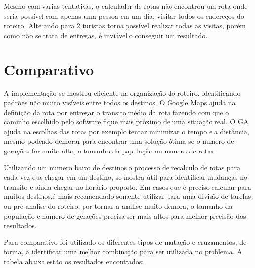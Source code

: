 Mesmo com varias tentativas, o calculador de rotas não encontrou um rota onde seria possível com apenas uma pessoa em um dia, visitar todos os endereços do roteiro. Alterando para 2 turistas torna possível realizar todas as visitas, porém como não se trata de entregas, é inviável o conseguir um resultado.

\pagebreak
\section{Comparativo}

A implementação se mostrou eficiente na organização do roteiro, identificando padrões não muito visíveis entre todos os destinos. O Google Maps ajuda na definição da rota por entregar o transito médio da rota fazendo com que o caminho escolhido pelo software fique mais próximo de uma situação real. O GA ajuda na escolhas das rotas por exemplo tentar minimizar o tempo e a distância, mesmo podendo demorar para encontrar uma solução ótima se o numero de gerações for muito alto, o tamanho da população ou numero de rotas. 

Utilizando um numero baixo de destinos o processo de recalculo de rotas para cada vez que chegar em um  destino, se mostra útil para identificar mudanças no transito e ainda chegar no horário proposto. Em casos que é preciso calcular para muitos destinos,é mais recomendado somente utilizar para uma divisão de tarefas ou pré-analise do roteiro, por tornar a analise muito demora, o tamanho da população e numero de gerações precisa ser mais altos para melhor precisão dos resultados.

Para comparativo foi utilizado os diferentes tipos de mutação e cruzamentos, de forma, a identificar uma melhor combinação para ser utilizada no problema. A tabela abaixo estão os resultados encontrados:


